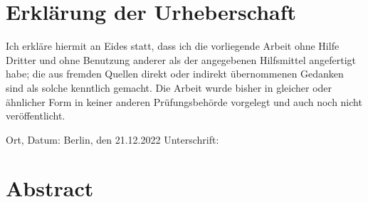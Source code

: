 \chapter*{Erkl{\"a}rung der Urheberschaft}
Ich erkläre hiermit an Eides statt, dass ich die vorliegende Arbeit ohne Hilfe Dritter und ohne Benutzung anderer als der angegebenen Hilfsmittel angefertigt habe; die aus fremden Quellen direkt oder indirekt übernommenen Gedanken sind als solche kenntlich gemacht. Die Arbeit wurde bisher in gleicher oder ähnlicher Form in keiner anderen Prüfungsbehörde vorgelegt und auch noch nicht veröffentlicht.


\vspace{4cm}

Ort, Datum:\hspace{0.25cm} Berlin, den 21.12.2022 \hfill Unterschrift: \hspace{1cm}

\newpage
\chapter*{Abstract}


\newpage
